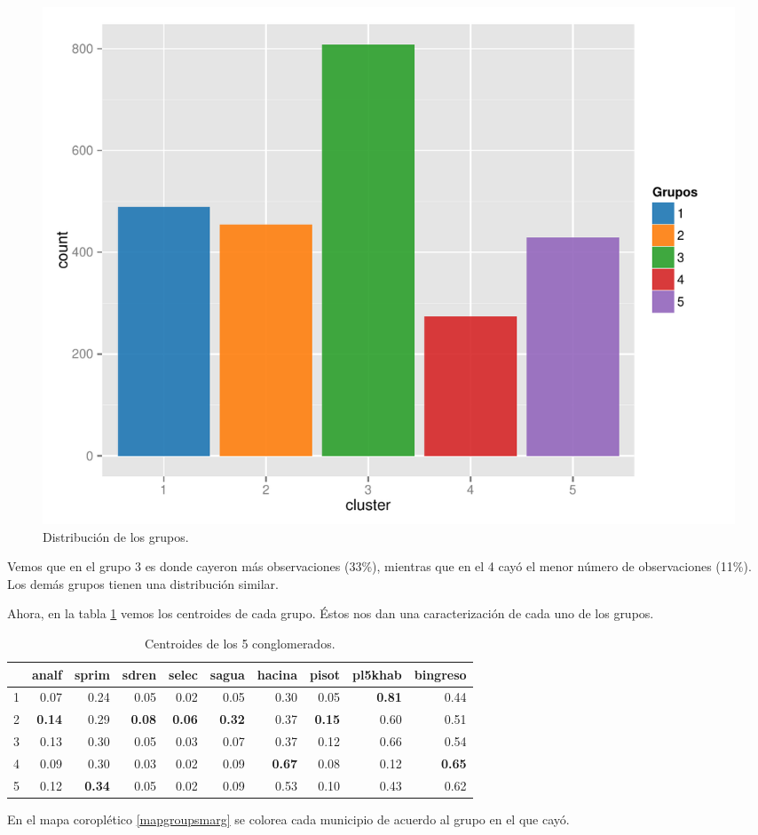 \begin{figure}[!ht]
  \centering
  \includegraphics[width=.7\textwidth]{./plots/clustering_plot.pdf}
  \caption{Distribución de los grupos. \label{obj:graf5g} }
\end{figure}

Vemos que en el grupo 3 es donde cayeron más observaciones (33\%), mientras que en el 4 cayó el menor número de observaciones (11\%). Los demás grupos tienen una distribución similar.

Ahora, en la tabla \ref{tab:centroides} vemos los centroides de cada grupo. Éstos nos dan una caracterización de cada uno de los grupos.

\begin{table}
\centering
\begin{tabular}{rrrrrrrrrr}
  \hline
 & analf & sprim & sdren & selec & sagua & hacina & pisot & pl5khab & bingreso\\ 
  \hline
  1 & 0.07 & 0.24 & 0.05 & 0.02 & 0.05 & 0.30 & 0.05 & \textbf{0.81} & 0.44 \\ 
  2 & \textbf{0.14} & 0.29 & \textbf{0.08} & \textbf{0.06} & \textbf{0.32} & 0.37 & \textbf{0.15} & 0.60 & 0.51 \\ 
  3 & 0.13 & 0.30 & 0.05 & 0.03 & 0.07 & 0.37 & 0.12 & 0.66 & 0.54 \\ 
  4 & 0.09 & 0.30 & 0.03 & 0.02 & 0.09 & \textbf{0.67 }& 0.08 & 0.12 & \textbf{0.65} \\ 
  5 & 0.12 & \textbf{0.34} & 0.05 & 0.02 & 0.09 & 0.53 & 0.10 & 0.43 & 0.62 \\ 
   \hline
\end{tabular}
\caption{Centroides de los 5 conglomerados. \label{tab:centroides}}
\end{table}



En el mapa coroplético \ref{mapgroupsmarg} se colorea cada municipio de acuerdo al grupo en el que cayó.

